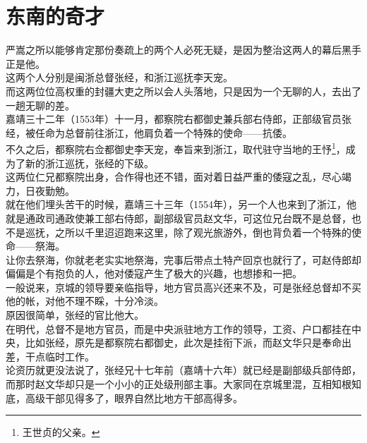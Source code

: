 \section{东南的奇才}
\ifnum{}
	\begin{multicols}{\theparacolNo}
\fi
严嵩之所以能够肯定那份奏疏上的两个人必死无疑，是因为整治这两人的幕后黑手正是他。\\

这两个人分别是闽浙总督张经，和浙江巡抚李天宠。\\

而这两位位高权重的封疆大吏之所以会人头落地，只是因为一个无聊的人，去出了一趟无聊的差。\\

嘉靖三十二年（1553年）十一月，都察院右都御史兼兵部右侍郎，正部级官员张经，被任命为总督前往浙江，他肩负着一个特殊的使命——抗倭。\\

不久之后，都察院右佥都御史李天宠，奉旨来到浙江，取代驻守当地的王忬\footnote{王世贞的父亲。}，成为了新的浙江巡抚，张经的下级。\\

这两位仁兄都察院出身，合作得也还不错，面对着日益严重的倭寇之乱，尽心竭力，日夜勤勉。\\

就在他们埋头苦干的时候，嘉靖三十三年（1554年），另一个人也来到了浙江，他就是通政司通政使兼工部右侍郎，副部级官员赵文华，可这位兄台既不是总督，也不是巡抚，之所以千里迢迢跑来这里，除了观光旅游外，倒也背负着一个特殊的使命——祭海。\\

让你去祭海，你就老老实实地祭海，完事后带点土特产回京也就行了，可赵侍郎却偏偏是个有抱负的人，他对倭寇产生了极大的兴趣，也想掺和一把。\\

一般说来，京城的领导要亲临指导，地方官员高兴还来不及，可是张经总督却不买他的帐，对他不理不睬，十分冷淡。\\

原因很简单，张经的官比他大。\\

在明代，总督不是地方官员，而是中央派驻地方工作的领导，工资、户口都挂在中央，比如张经，原先是都察院右都御史，此次是挂衔下派，而赵文华只是奉命出差，干点临时工作。\\

论资历就更没法说了，张经兄十七年前（嘉靖十六年）就已经是副部级兵部侍郎，而那时赵文华却只是一个小小的正处级刑部主事。大家同在京城里混，互相知根知底，高级干部见得多了，眼界自然比地方干部高得多。\\


\end{multicols}
